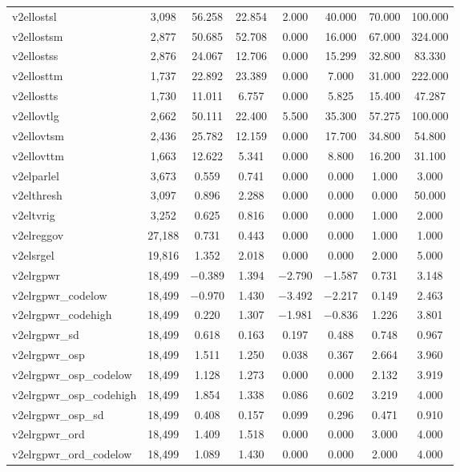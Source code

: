 \begin{table}[!htbp]
\begin{tabular}{@{\extracolsep{5pt}}lccccccc}
v2ellostsl & 3,098 & 56.258 & 22.854 & 2.000 & 40.000 & 70.000 & 100.000 \\ 
v2ellostsm & 2,877 & 50.685 & 52.708 & 0.000 & 16.000 & 67.000 & 324.000 \\ 
v2ellostss & 2,876 & 24.067 & 12.706 & 0.000 & 15.299 & 32.800 & 83.330 \\ 
v2ellosttm & 1,737 & 22.892 & 23.389 & 0.000 & 7.000 & 31.000 & 222.000 \\ 
v2ellostts & 1,730 & 11.011 & 6.757 & 0.000 & 5.825 & 15.400 & 47.287 \\ 
v2ellovtlg & 2,662 & 50.111 & 22.400 & 5.500 & 35.300 & 57.275 & 100.000 \\ 
v2ellovtsm & 2,436 & 25.782 & 12.159 & 0.000 & 17.700 & 34.800 & 54.800 \\ 
v2ellovttm & 1,663 & 12.622 & 5.341 & 0.000 & 8.800 & 16.200 & 31.100 \\ 
v2elparlel & 3,673 & 0.559 & 0.741 & 0.000 & 0.000 & 1.000 & 3.000 \\ 
v2elthresh & 3,097 & 0.896 & 2.288 & 0.000 & 0.000 & 0.000 & 50.000 \\ 
v2eltvrig & 3,252 & 0.625 & 0.816 & 0.000 & 0.000 & 1.000 & 2.000 \\ 
v2elreggov & 27,188 & 0.731 & 0.443 & 0.000 & 0.000 & 1.000 & 1.000 \\ 
v2elsrgel & 19,816 & 1.352 & 2.018 & 0.000 & 0.000 & 2.000 & 5.000 \\ 
v2elrgpwr & 18,499 & $-$0.389 & 1.394 & $-$2.790 & $-$1.587 & 0.731 & 3.148 \\ 
v2elrgpwr\_codelow & 18,499 & $-$0.970 & 1.430 & $-$3.492 & $-$2.217 & 0.149 & 2.463 \\ 
v2elrgpwr\_codehigh & 18,499 & 0.220 & 1.307 & $-$1.981 & $-$0.836 & 1.226 & 3.801 \\ 
v2elrgpwr\_sd & 18,499 & 0.618 & 0.163 & 0.197 & 0.488 & 0.748 & 0.967 \\ 
v2elrgpwr\_osp & 18,499 & 1.511 & 1.250 & 0.038 & 0.367 & 2.664 & 3.960 \\ 
v2elrgpwr\_osp\_codelow & 18,499 & 1.128 & 1.273 & 0.000 & 0.000 & 2.132 & 3.919 \\ 
v2elrgpwr\_osp\_codehigh & 18,499 & 1.854 & 1.338 & 0.086 & 0.602 & 3.219 & 4.000 \\ 
v2elrgpwr\_osp\_sd & 18,499 & 0.408 & 0.157 & 0.099 & 0.296 & 0.471 & 0.910 \\ 
v2elrgpwr\_ord & 18,499 & 1.409 & 1.518 & 0.000 & 0.000 & 3.000 & 4.000 \\ 
v2elrgpwr\_ord\_codelow & 18,499 & 1.089 & 1.430 & 0.000 & 0.000 & 2.000 & 4.000 \\ 

\end{tabular}
\end{table}
